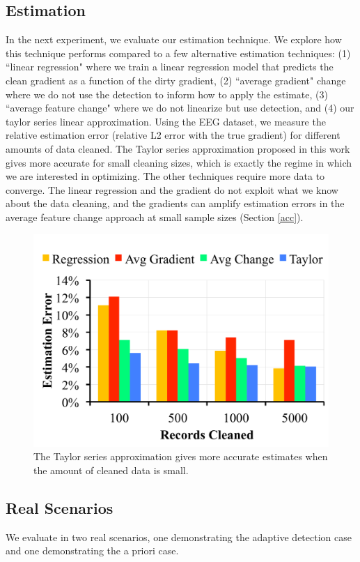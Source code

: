 \subsection{Estimation}\label{est}
In the next experiment, we evaluate our estimation technique.
We explore how this technique performs compared to a few alternative estimation techniques: (1) ``linear regression" where we train a linear regression model that predicts the clean gradient as a function of the dirty gradient, (2) ``average gradient" change where we do not use the detection to inform how to apply the estimate, (3) ``average feature change" where we do not linearize but use detection, and (4) our taylor series linear approximation.
Using the EEG dataset, we measure the relative estimation error (relative L2 error with the true gradient) for different amounts of data cleaned.
The Taylor series approximation proposed in this work gives more accurate for small cleaning sizes, which is exactly the regime in which we are interested in optimizing.
The other techniques require more data to converge.
The linear regression and the gradient do not exploit what we know about the data cleaning, and the gradients can amplify estimation errors in the average feature change approach at small sample sizes (Section \ref{acc}).

\begin{figure}[ht!]
\vspace{-2em}
\centering
 \includegraphics[width=0.5\columnwidth]{exp/exp12.pdf}
 \caption{The Taylor series approximation gives more accurate estimates when the amount of cleaned data is small. \label{tradeoffs3}}
\end{figure}


\subsection{Real Scenarios}
We evaluate \sys in two real scenarios, one demonstrating the adaptive detection case and one demonstrating the a priori case.

